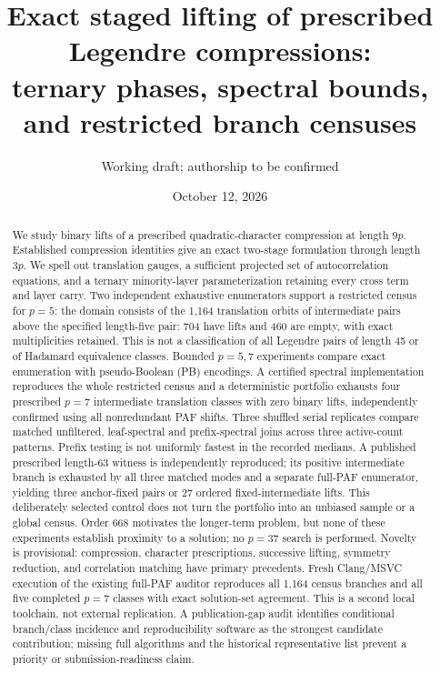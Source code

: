 \documentclass[11pt]{article}
\title{Exact staged lifting of prescribed Legendre compressions:\\
ternary phases, spectral bounds, and restricted branch censuses}
\author{Working draft; authorship to be confirmed}
\date{October 12, 2026}
\begin{document}
\maketitle
\begin{abstract}
We study binary lifts of a prescribed quadratic-character compression at
length $9p$. Established compression identities give an exact two-stage
formulation through length $3p$. We spell out translation gauges, a
sufficient projected set of autocorrelation equations, and a ternary
minority-layer parameterization retaining every cross term and layer carry.
Two independent exhaustive enumerators support a restricted census for
$p=5$: the domain consists of the 1,164 translation orbits of intermediate
pairs above the specified length-five pair: 704 have lifts and 460 are empty,
with exact multiplicities retained. This is not a classification of all Legendre
pairs of length 45 or of Hadamard equivalence classes. Bounded $p=5,7$
experiments compare exact enumeration with pseudo-Boolean (PB) encodings.
A certified spectral implementation reproduces the whole restricted census
and a deterministic portfolio exhausts four prescribed $p=7$ intermediate
translation classes with zero binary lifts, independently confirmed using
all nonredundant PAF shifts. Three shuffled serial replicates compare matched
unfiltered, leaf-spectral and prefix-spectral joins across three active-count
patterns. Prefix testing is not uniformly fastest in the recorded medians.
A published prescribed length-63 witness is independently reproduced;
its positive intermediate branch is exhausted by all three matched modes
and a separate full-PAF enumerator, yielding three anchor-fixed pairs or
27 ordered fixed-intermediate lifts. This deliberately selected control
does not turn the portfolio into an unbiased sample or a global census.
Order 668 motivates the longer-term problem, but none of these experiments
establish proximity to a solution; no $p=37$ search is performed.
Novelty is provisional: compression, character prescriptions, successive
lifting, symmetry reduction, and correlation matching have primary precedents.
Fresh Clang/MSVC execution of the existing full-PAF auditor reproduces all
1,164 census branches and all five completed $p=7$ classes with exact
solution-set agreement. This is a second local toolchain, not external
replication. A publication-gap audit identifies conditional branch/class
incidence and reproducibility software as the strongest candidate contribution;
missing full algorithms and the historical representative list prevent a
priority or submission-readiness claim.

\end{abstract}
\end{document}
